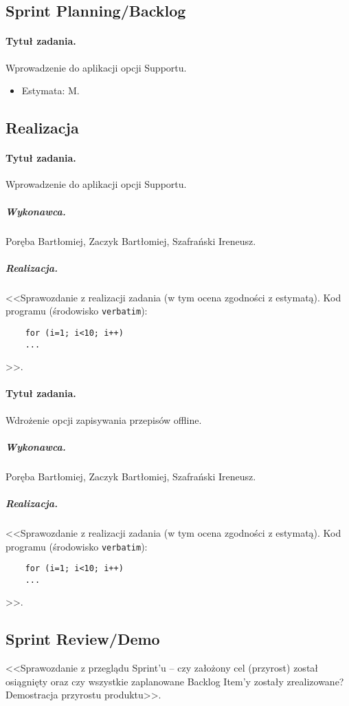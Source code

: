 \documentclass[a4paper]{article}
\begin{document}
	\subsection{Sprint Planning/Backlog}
	
	\paragraph{Tytuł zadania.} Wprowadzenie do aplikacji opcji Supportu.
	\begin{itemize}
		\item Estymata: M.
	\end{itemize}
	
	
	\subsection{Realizacja}
	
	\paragraph{Tytuł zadania.} Wprowadzenie do aplikacji opcji Supportu.
	\subparagraph{Wykonawca.} Poręba Bartłomiej, Zaczyk Bartłomiej, Szafrański Ireneusz.
	\subparagraph{Realizacja.} <<Sprawozdanie z realizacji zadania (w tym ocena zgodności z estymatą). Kod programu (środowisko \texttt{verbatim}): \begin{verbatim}
	for (i=1; i<10; i++)
	...
	\end{verbatim}>>.
	
	\paragraph{Tytuł zadania.} Wdrożenie opcji zapisywania przepisów offline.
	\subparagraph{Wykonawca.} Poręba Bartłomiej, Zaczyk Bartłomiej, Szafrański Ireneusz.
	\subparagraph{Realizacja.} <<Sprawozdanie z realizacji zadania (w tym ocena zgodności z estymatą). Kod programu (środowisko \texttt{verbatim}): \begin{verbatim}
	for (i=1; i<10; i++)
	...
	\end{verbatim}>>.
	
	
	\subsection{Sprint Review/Demo}
	<<Sprawozdanie z przeglądu Sprint'u -- czy założony cel (przyrost) został osiągnięty oraz czy wszystkie zaplanowane Backlog Item'y zostały zrealizowane? Demostracja przyrostu produktu>>.
	
\end{document}
